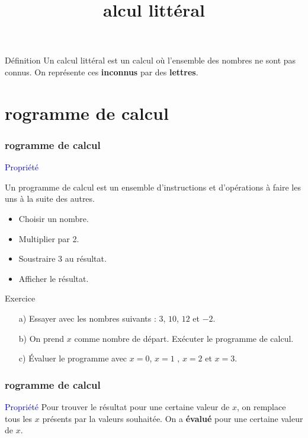 \documentclass{beamer}
\title{\rmfamily{\textsc{C}}alcul littéral}
\begin{document}
\frame{\titlepage}

\begin{frame}
  \begin{alertblock}{Définition}
    Un calcul littéral est un calcul où l'ensemble des nombres ne sont pas connus. On représente ces \textbf{inconnus} par des \textbf{lettres}.
  \end{alertblock}
\end{frame}

\section{rogramme de calcul}

\begin{frame}
  \frametitle{rogramme de calcul}

  \begin{block}{\textcolor{blue}{Propriété}}

    \begin{multicols}{2}
      Un programme de calcul est un ensemble d'instructions et d'opérations à faire les uns à la suite des autres.
      \begin{itemize}
      \item Choisir un nombre.
      \item Multiplier par 2.
      \item Soustraire 3 au résultat.
      \item Afficher le résultat.
      \end{itemize}
    \end{multicols}
  \end{block}
  
  \begin{exampleblock}{Exercice}
    \begin{enumerate}
    \item[a)] Essayer avec les nombres suivants : $3$, $10$, $12$ et $-2$.
    \item[b)] On prend $x$ comme nombre de départ. Exécuter le programme de calcul. 
    \item[c)] Évaluer le programme avec $x=0$, $x=1$ , $x=2$ et $x=3$.
    \end{enumerate}

  \end{exampleblock}
\end{frame}

\begin{frame}
  \frametitle{rogramme de calcul}
  \begin{block}{\textcolor{blue}{Propriété}}
    Pour trouver le résultat pour une certaine valeur de $x$, on remplace tous les $x$ présents par la valeurs souhaitée. On a \textbf{évalué} pour une certaine valeur de $x$.
  \end{block}
\end{frame}
\end{document}
